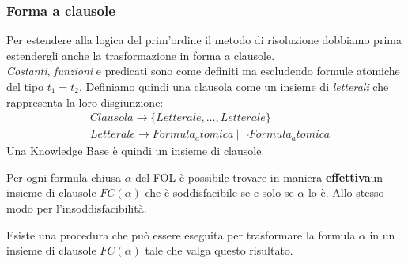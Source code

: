 \subsubsection{Forma a clausole}
Per estendere alla logica del prim'ordine il metodo di risoluzione dobbiamo prima estendergli anche la trasformazione in forma a clausole.\\
\textit{Costanti}, \textit{funzioni} e predicati sono come definiti ma escludendo formule atomiche del tipo $t_1 = t_2$. Definiamo quindi una clausola come un insieme di \textit{letterali} che rappresenta la loro disgiunzione:
\begin{align}
	& Clausola \rightarrow \{Letterale, \ldots, Letterale\}\\
	& Letterale \rightarrow Formula_atomica \: \vert \: \neg Formula_atomica
\end{align}
Una Knowledge Base è quindi un insieme di clausole.
\begin{theorem}
	Per ogni formula chiusa $\alpha$ del FOL è possibile trovare in maniera \textbf{effettiva}un insieme di clausole $FC(\alpha)$ che è soddisfacibile se e solo se $\alpha$ lo è. Allo stesso modo per l'insoddisfacibilità.
\end{theorem}
\begin{definition}[Effettivo]
	Esiste una procedura che può essere eseguita per trasformare la formula $\alpha$ in un insieme di clausole $FC(\alpha)$ tale che valga questo risultato.
\end{definition}

